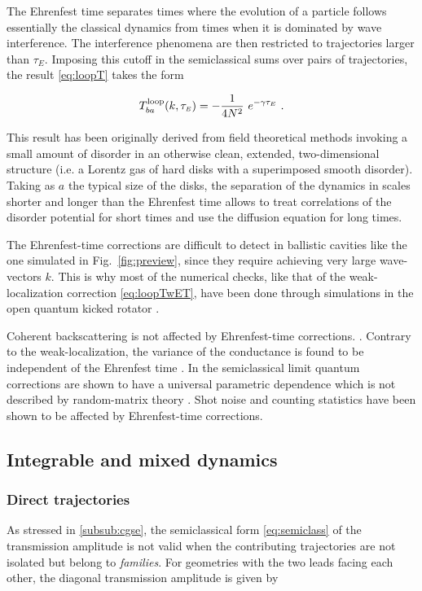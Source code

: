 \documentclass[a4paper,10pt]{article}
\newcommand{\ET}{\tau_{\scriptscriptstyle E}}
\newcommand{\nin}{\noindent}
\newcommand{\be}{\begin{equation}}
\newcommand{\ee}{\end{equation}}
\begin{document}
\nin The Ehrenfest time separates times where the evolution of a particle follows essentially the classical dynamics from times when it is dominated by wave interference. The interference phenomena are then restricted to trajectories larger than $\ET$. Imposing this cutoff in the semiclassical sums over pairs of trajectories, the result \eqref{eq:loopT} takes the form \cite{Adagi03}

\be
T_{ba}^{\rm loop}(k,\ET) = - \frac{1}{4N^2} \ e^{-\gamma \ET} \ .
\label{eq:loopTwET} 
\ee

\nin This result has been originally derived from field theoretical methods \cite{Alei96} invoking a small amount of disorder in an otherwise clean, extended, two-dimensional structure (i.e. a Lorentz gas of hard disks with a superimposed smooth disorder). Taking as $a$ the typical size of the disks, the separation of the dynamics in scales shorter and longer than the Ehrenfest time allows to treat correlations of the disorder potential for short times and use the diffusion equation for long times.

\nin The Ehrenfest-time corrections are difficult to detect in ballistic cavities like the one simulated in Fig.~\ref{fig:preview}, since they require achieving very large wave-vectors $k$. This is why most of the numerical checks, like that of the weak-localization correction \eqref{eq:loopTwET}, have been done through simulations in the open quantum kicked rotator \cite{Rahav05}.

\nin Coherent backscattering is not affected by Ehrenfest-time corrections.
\cite{Rahav06}. Contrary to the weak-localization, the variance of the conductance is found to be independent of the Ehrenfest time \cite{Twor04,Jacq04,Brou06}. In the semiclassical limit quantum corrections are shown to have a universal parametric dependence which is not described by random-matrix theory \cite{Brou07}. Shot noise \cite{Brou07b} and counting statistics \cite{Walt11} have been shown to be affected by Ehrenfest-time corrections.

\subsection{Integrable and mixed dynamics}

\subsubsection{Direct trajectories} 

As stressed in \ref{subsub:cgse}, the semiclassical form \eqref{eq:semiclass} of the transmission amplitude is not valid when the contributing trajectories are not isolated but belong to {\it families}. For geometries with the two leads facing each other, the diagonal transmission amplitude is given by \cite{Chaost}
\end{document}

